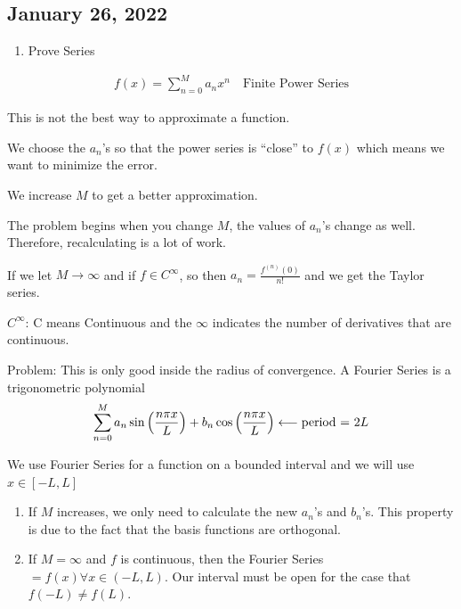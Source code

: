 \documentclass{article}
\begin{document}
\subsection*{January 26, 2022}
\begin{enumerate}
  \item Prove Series
\end{enumerate}

  \begin{align}
    f(x) = \sum^M_{n = 0} a_n x^n \quad \text{Finite Power Series}
  \end{align}

  This is not the best way to approximate a function.

  We choose the $a_n$'s so that the power series is ``close'' to $f(x)$ which means we want to minimize the error.

  We increase $M$ to get a better approximation.

  The problem begins when you change $M$, the values of $a_n$'s change as well. Therefore, recalculating is a lot of work.

  If we let $M \to \infty$ and if $f \in C^\infty$, so then $a_n = \frac{f^{(n)}(0)}{n!}$ and we get the Taylor series.

  \note $C^\infty$: C means Continuous and the $\infty$ indicates the number of derivatives that are continuous.

  Problem: This is only good inside the radius of convergence.
  \bigbreak
  A Fourier Series is a trigonometric polynomial
  \begin{align}
    \sum_{n = 0}^M a_n \sin \Big( \frac{n \pi x}{L} \Big) + b_n \cos \Big( \frac{n \pi x}{L} \Big) \longleftarrow \text{period = } 2L
  \end{align}

  We use Fourier Series for a function on a bounded interval and we will use $x \in [-L, L]$

  \begin{enumerate}
    \item If $M$ increases, we only need to calculate the new $a_n$'s and $b_n$'s. This property is due to the fact that the basis functions are orthogonal.

    \item If $M = \infty$ and $f$ is continuous, then the Fourier Series $= f(x) \forall x \in (-L, L)$. Our interval must be open for the case that $f(-L) \neq f(L)$.
  \end{enumerate}
\end{document}
